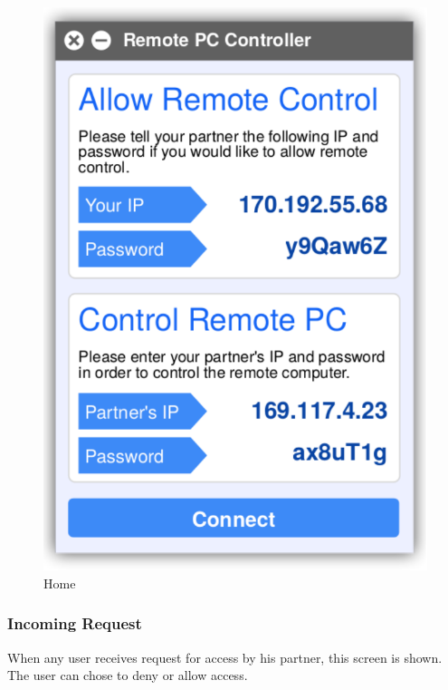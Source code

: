 \documentclass[12pt, a4paper]{article}
\begin{document}
\begin{figure}[h!]
\centering
\includegraphics[scale=0.75]{home}
\caption{Home}
\end{figure}

\subsubsection{Incoming Request}
When any user receives request for access by his partner, this screen is shown. The user can chose to deny or allow access.
\end{document}
